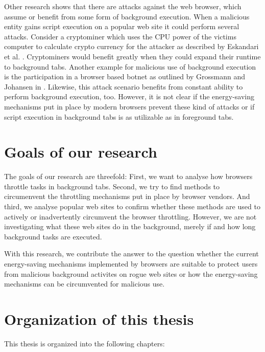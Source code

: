 \documentclass[
	ruledheaders=section,%
	class=report,%
	thesis={type=bachelor},%
	accentcolor=9c,%
	custommargins=true,%
	marginpar=false,%
	parskip=half-,%
	fontsize=11pt,%
]{tudapub}
\begin{document}
Other research shows that there are attacks against the web browser, which assume or benefit from some form of background execution. When a malicious entity gains script execution on a popular web site it could perform several attacks. Consider a cryptominer which uses the CPU power of the victims computer to calculate crypto currency for the attacker as described by Eskandari et al. \cite{eskandari2018first}. Cryptominers would benefit greatly when they could expand their runtime to background tabs. Another example for malicious use of background execution is the participation in a browser based botnet as outlined by Grossmann and Johansen in \cite{grossmann2013million}. Likewise, this attack scenario benefits from constant ability to perform background execution, too. However, it is not clear if the energy-saving mechanisms put in place by modern browsers prevent these kind of attacks or if script execution in background tabs is as utilizable as in foreground tabs.

  \section{Goals of our research}

  The goals of our research are threefold: First, we want to analyse how browsers throttle tasks in background tabs. Second, we try to find methods to circumenvent the throttling mechanisms put in place by browser vendors. And third, we analyse popular web sites to confirm whether these methods are used to actively or inadvertently circumvent the browser throttling. However, we are not investigating what these web sites do in the background, merely if and how long background tasks are executed.

  With this research, we contribute the answer to the question whether the current energy-saving mechanisms implemented by browsers are suitable to protect users from malicious background activites on rogue web sites or how the energy-saving mechanisms can be circumvented for malicious use.

  \section{Organization of this thesis}

  This thesis is organized into the following chapters:
\end{document}
